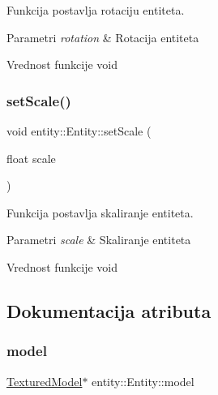 Funkcija postavlja rotaciju entiteta. 


\begin{DoxyParams}{Parametri}
{\em rotation} & Rotacija entiteta \\
\hline
\end{DoxyParams}
\begin{DoxyReturn}{Vrednost funkcije}
void 
\end{DoxyReturn}
\mbox{\label{classentity_1_1Entity_a5d2d7bd6cd754ce566e2d4a9e4b991e0}} 
\subsubsection{\texorpdfstring{set\+Scale()}{setScale()}}
{\footnotesize\ttfamily void entity\+::\+Entity\+::set\+Scale (\begin{DoxyParamCaption}\item[{float}]{scale }\end{DoxyParamCaption})}



Funkcija postavlja skaliranje entiteta. 


\begin{DoxyParams}{Parametri}
{\em scale} & Skaliranje entiteta \\
\hline
\end{DoxyParams}
\begin{DoxyReturn}{Vrednost funkcije}
void 
\end{DoxyReturn}


\subsection{Dokumentacija atributa}
\mbox{\label{classentity_1_1Entity_ac7848c5d47d4b2bf12c84ddbbc32052a}} 
\subsubsection{\texorpdfstring{model}{model}}
{\footnotesize\ttfamily \hyperlink{classmodel_1_1TexturedModel}{Textured\+Model}$\ast$ entity\+::\+Entity\+::model\hspace{0.3cm}{\ttfamily [private]}}



